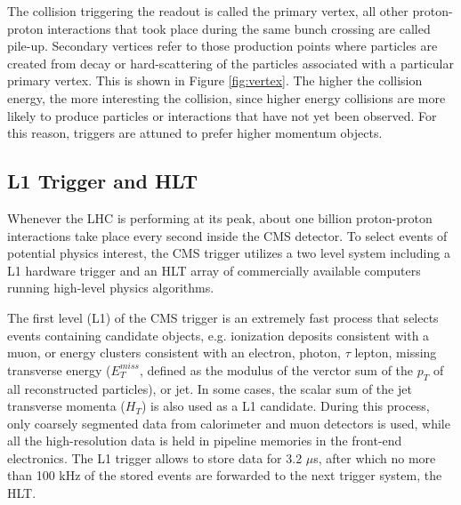  The collision triggering the readout is called the primary vertex,  all other proton-proton interactions that took place during the same bunch crossing are called pile-up. Secondary vertices refer to those production points where particles are created from decay or hard-scattering of the particles associated with a particular primary vertex. This is shown in Figure \ref{fig:vertex}. The higher the collision energy, the more interesting the collision, since higher energy collisions are more likely to produce particles or interactions that have not yet been observed. For this reason, triggers are attuned to prefer higher momentum objects. 

\subsection{L1 Trigger and HLT}
 Whenever the LHC is performing at its peak, about one billion proton-proton interactions take place every second inside the CMS detector. To select events of potential physics interest, the CMS trigger\cite{Khachatryan_2017} utilizes a two level system including a L1 hardware trigger and an HLT array of commercially available computers running high-level physics algorithms.

The first level (L1) of the CMS trigger is an extremely fast process that selects events containing candidate objects, e.g. ionization deposits consistent with a muon, or energy clusters consistent with an electron, photon, $\tau$ lepton, missing transverse energy ($E_{T}^{miss}$, defined as the modulus of the verctor sum of the $p_{T}$ of all reconstructed particles), or jet. In some cases, the scalar sum of the jet transverse momenta ($H_{T}$) is also used as a L1 candidate. During this process, only coarsely segmented data from calorimeter and muon detectors is used, while all the high-resolution data is held in pipeline memories in the front-end electronics. The L1 trigger allows to store data for 3.2 $\mu$s, after which no more than 100 kHz of the stored events are forwarded to the next trigger system, the HLT.  


